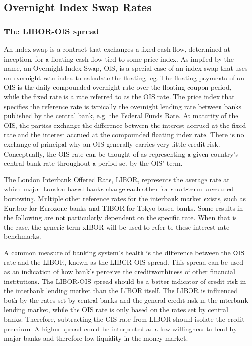 \documentclass[main.tex]{subfiles}
\begin{document}
    \subsection{Overnight Index Swap Rates}
    
    \subsubsection{The LIBOR-OIS spread}
    An index swap is a contract that exchanges a fixed cash flow, determined at inception,
    for a floating cash flow tied to some price index.
    As implied by the name, an Overnight Index Swap, OIS, is a special case of an index swap
    that uses an overnight rate index to calculate the floating leg.
    The floating payments of an OIS is the daily compounded overnight rate 
    over the floating coupon period,
    while the fixed rate is a rate referred to as the OIS rate.
    The price index that specifies the reference rate is typically the overnight 
    lending rate between banks published by the central bank, e.g. the Federal Funds Rate.
    At maturity of the OIS, the parties exchange the difference between the interest accrued 
    at the fixed rate and the interest accrued at the compounded floating index rate.
    There is no exchange of principal why an OIS generally carries very little credit risk. 
    Conceptually, the OIS rate can be thought of as representing a given country's
    central bank rate throughout a period set by the OIS' term. 

    The London Interbank Offered Rate, LIBOR, represents the average rate 
    at which major London based banks charge each other for short-term unsecured borrowing.
    Multiple other reference rates for the interbank market exists, 
    such as Euribor for Eurozone banks and TIBOR for Tokyo based banks.
    Some results in the following are not particularly dependent on the specific rate.
    When that is the case, the generic term xIBOR will be used 
    to refer to these interest rate benchmarks.

    A common measure of banking system's health is the difference between the OIS rate
    and the LIBOR, known as the LIBOR-OIS spread.
    This spread can be used as an indication of how bank's perceive the creditworthiness
    of other financial institutions. 
    The LIBOR-OIS spread should be a better indicator of credit risk in the interbank lending market
    than the LIBOR itself. 
    The LIBOR is influenced both by the rates set by central banks and 
    the general credit risk in the interbank lending market,
    while the OIS rate is only based on the rates set by central banks.
    Therefore, subtracting the OIS rate from LIBOR should isolate the credit premium.
    A higher spread could be interpreted as a low willingness to lend by major banks
    and therefore low liquidity in the money market.
\end{document}
